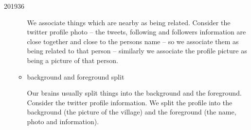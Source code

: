 \documentclass[10pt,\jkfside,a4paper]{article}
\begin{document}
\begin{examquestion}{2019}{3}{6}
\begin{enumerate}[label=(\alph*)]
\begin{itemize}
We associate things which are nearby as being related. Consider the twitter profile
photo -- the tweets, following and followers information are close together and close
to the persons name -- so we associate them as being related to that person -- similarly
we associate the profile picture as being a picture of that person.

\item background and foreground split

Our brains usually split things into the background and the foreground.
Consider the twitter profile information. We split the profile into the background
(the picture of the village) and the foreground (the name, photo and information).

\end{itemize}

\end{enumerate}

\end{examquestion}
\end{document}
